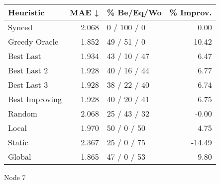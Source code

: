 \begin{tabular}{lrlr}
\toprule
\textbf{Heuristic} & \textbf{MAE ↓} & \textbf{\% Be/Eq/Wo} & \textbf{\% Improv.} \\
\midrule
            Synced &          2.068 &          0 / 100 / 0 &                0.00 \\
     Greedy Oracle &          1.852 &          49 / 51 / 0 &               10.42 \\
         Best Last &          1.934 &         43 / 10 / 47 &                6.47 \\
       Best Last 2 &          1.928 &         40 / 16 / 44 &                6.77 \\
       Best Last 3 &          1.928 &         38 / 22 / 40 &                6.74 \\
    Best Improving &          1.928 &         40 / 20 / 41 &                6.75 \\
            Random &          2.068 &         25 / 43 / 32 &               -0.00 \\
             Local &          1.970 &          50 / 0 / 50 &                4.75 \\
            Static &          2.367 &          25 / 0 / 75 &              -14.49 \\
            Global &          1.865 &          47 / 0 / 53 &                9.80 \\
\bottomrule
\end{tabular}
\caption{Node 7}
\label{tab:ds_non_lr05_le1_bs2_7}
